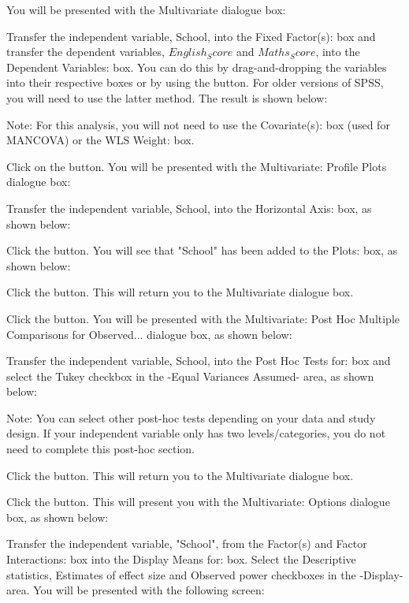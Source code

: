 \documentclass[12pt]{article} %
\begin{document}
You will be presented with the Multivariate dialogue box:



Transfer the independent variable, School, into the Fixed Factor(s): box and transfer the dependent variables, $English_Score$ and $Maths_Score$, into the 
Dependent Variables: box. You can do this by drag-and-dropping the variables into their respective boxes or by using the  button. For older versions of SPSS, you will need to use the latter method. The result is shown below:



Note: For this analysis, you will not need to use the Covariate(s): box (used for MANCOVA) or the WLS Weight: box.

Click on the  button. You will be presented with the Multivariate: Profile Plots dialogue box:



Transfer the independent variable, School, into the Horizontal Axis: box, as shown below:


Click the  button. You will see that "School" has been added to the Plots: box, as shown below:



Click the  button. This will return you to the Multivariate dialogue box.

Click the  button. You will be presented with the Multivariate: Post Hoc Multiple Comparisons for Observed... dialogue box, as shown below:



Transfer the independent variable, School, into the Post Hoc Tests for: box and select the Tukey checkbox in the -Equal Variances Assumed- area, as shown below:



Note: You can select other post-hoc tests depending on your data and study design. If your independent variable only has two levels/categories, you do not need to complete this post-hoc section.

Click the  button. This will return you to the Multivariate dialogue box.


Click the  button. This will present you with the Multivariate: Options dialogue box, as shown below:



Transfer the independent variable, "School", from the Factor(s) and Factor Interactions: box into the Display Means for: box. Select the Descriptive statistics, Estimates of effect size and Observed power checkboxes in the -Display- area. You will be presented with the following screen:
\end{document}

